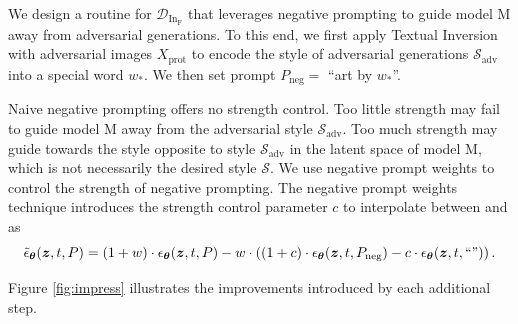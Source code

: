 \documentclass{article}
\newcommand{\style}[1]{\mathcal{#1}}
\newcommand{\advstyle}[1]{\style{#1}_{\textrm{adv}}}
\newcommand{\model}[1]{\mathrm{#1}}
\newcommand{\word}[1]{#1_*}
\newcommand{\denoiser}[0]{\eps_{\vtheta}}
\newcommand{\cfgdenoiser}[0]{\tilde{\eps}_{\vtheta}}
\newcommand{\advimgset}[0]{X_{\textrm{prot}}}
\newcommand{\negprompt}[0]{P_{\textrm{neg}}}
\newcommand{\defense}[1]{\mathcal{D}_{\mathrm{#1}}}
\begin{document}
We design a routine for $\defense{In_F}$ that leverages negative prompting to guide model $\model{M}$ away from adversarial generations.
To this end, we first apply Textual Inversion with adversarial images $\advimgset$ to encode the style of adversarial generations $\advstyle{S}$ into a special word $\word{w}$. We then set prompt $\negprompt = $ ``art by $\word{w}$\!''. 

Naive negative prompting offers no strength control. Too little strength may fail to guide model $\model{M}$ away from the adversarial style $\advstyle{S}$. Too much strength may guide towards the style opposite to style $\advstyle{S}$ in the latent space of model $\model{M}$, which is not necessarily the desired style $\style{S}$. We use negative prompt weights \citep{negativepromptweighting} to control the strength of negative prompting. The negative prompt weights technique introduces the strength
control parameter $c$ to interpolate between  and  as
\begin{equation}
    \label{eq:negpromptinterp}
    \f{\cfgdenoiser}{\vz, t, P} = \brace{1+w}\cdot\f{\denoiser}{\vz, t, P} - w\cdot\brace{\brace{1+c}\cdot\f{\denoiser}{\vz, t, \negprompt} - c\cdot\f{\denoiser}{\vz, t, \text{``''}}}.
\end{equation}

Figure \ref{fig:impress} illustrates the improvements introduced by each additional step.
\end{document}
